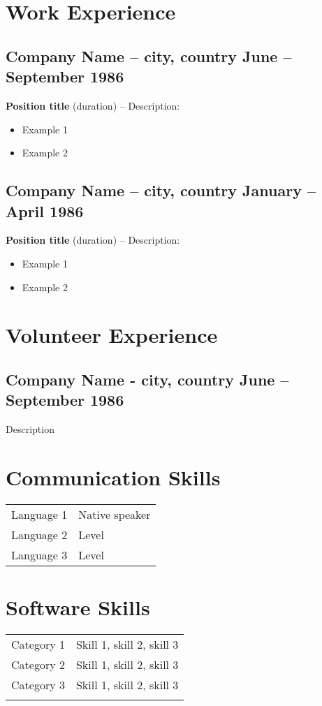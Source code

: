 \documentclass[a4paper]{article}
\begin{document}
\section{Work Experience}
\subsection{Company Name {\normalfont -- city, country} \hfill June -- September 1986}
{\bfseries Position title} (duration) -- Description:
  		\begin{itemize}[noitemsep,nolistsep]
   		\item Example 1
  		\item Example 2
		\end{itemize}

\subsection{Company Name {\normalfont -- city, country}  \hfill January -- April 1986}
{\bfseries Position title} (duration) -- Description:
  		\begin{itemize}[noitemsep,nolistsep]
   		\item Example 1
  		\item Example 2
		\end{itemize}

\section{Volunteer Experience}
\subsection{Company Name - city, country \hfill June -- September 1986}
Description

\begin{multicols}{2}
\section{Communication Skills}
\begin{tabular}{rl}
{Language 1} & Native speaker\\
{Language 2} & Level\\
{Language 3} & Level\\
\end{tabular}

\vspace*{\fill}

\section{Software Skills}
\begin{tabular}{rl}
{Category 1} & Skill 1, skill 2, skill 3\\
{Category 2} & Skill 1, skill 2, skill 3\\
{Category 3} & Skill 1, skill 2, skill 3\\
\vspace*{\fill}
\end{tabular}

\end{multicols}
\end{document}
